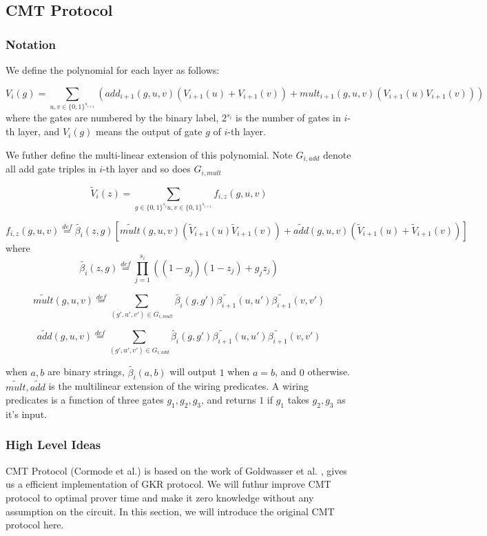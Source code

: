 
\subsection{CMT Protocol}
\label{subsec::CMT}
\subsubsection{Notation}
We define the polynomial for each layer as follows:
\begin{definition} 
	$$V_i(g)=\sum_{u, v \in \{0,1\}^{s_{i+1}}}(add_{i+1}(g,u,v)(V_{i+1}(u)+V_{i+1}(v))+mult_{i+1}(g,u,v)(V_{i+1}(u)V_{i+1}(v)))$$
	where the gates are numbered by the binary label, $2^{s_i}$ is the number of gates in $i$-th layer, and $V_i(g)$ means the output of gate $g$ of $i$-th layer.
\end{definition}

We futher define the multi-linear extension of this polynomial. Note $G_{i,add}$ denote all add gate triples in $i$-th layer and so does $G_{i,mult}$

\begin{definition}
	\label{def::multilinear}
	$$\tilde{V}_{i}(z)=\sum_{g\in\{0,1\}^{s_i} u, v\in \{0,1\}^{s_{i+1}}}f_{i,z}(g,u,v)$$

	$$f_{i,z}(g,u,v)\overset{def}{=}\tilde{\beta_{i}}(z, g)[\tilde{mult}(g, u, v)(\tilde{V}_{i+1}(u)\tilde{V}_{i+1}(v))+\tilde{add}(g,u,v)(\tilde{V}_{i+1}(u)+\tilde{V}_{i+1}(v))]$$
	where $$\tilde{\beta_{i}}(z,g)\overset{def}{=}\prod_{j=1}^{s_{i}}((1-g_{j})(1-z_{j})+g_{j}z_{j})$$

	$$\tilde{mult}(g,u,v)\overset{def}{=}\sum_{(g', u', v')\in G_{i,mult}}\tilde{\beta_{i}}(g,g')\tilde{\beta_{i+1}}(u,u')\tilde{\beta_{i+1}}(v,v')$$

	$$\tilde{add}(g,u,v)\overset{def}{=}\sum_{(g', u', v')\in G_{i,add}}\tilde{\beta_{i}}(g,g')\tilde{\beta_{i+1}}(u,u')\tilde{\beta_{i+1}}(v,v')$$

	when $a, b$ are binary strings, $\tilde{\beta_{i}}(a, b)$ will output $1$ when $a=b$, and $0$ otherwise. $\tilde{mult},\tilde{add}$ is the multilinear extension of the wiring predicates. A wiring predicates is a function of three gates $g_1, g_2, g_3$, and returns $1$ if $g_1$ takes $g_2, g_3$ as it's input.

\end{definition}

\subsubsection{High Level Ideas}
CMT Protocol (Cormode et al.)\cite{CMT} is based on the work of Goldwasser et al. \cite{GKR}, gives us a efficient implementation of GKR protocol. We will futhur improve CMT protocol to optimal prover time and make it zero knowledge without any assumption on the circuit. In this section, we will introduce the original CMT protocol here.

